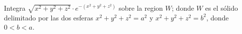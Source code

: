 Integra \( \sqrt{x^2 + y^2 + z^2} \cdot e^{-(x^2 + y^2 + z^2)} \) sobre la region \( W \); donde \( W \) es el sólido delimitado por las dos esferas \( x^2 + y^2 + z^2 = a^2 \) y \( x^2 + y^2 + z^2 = b^2 \), donde \( 0 < b < a \).
